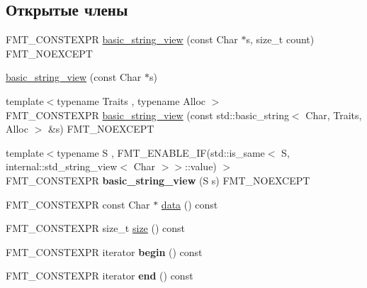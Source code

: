 \subsection*{Открытые члены}
\begin{DoxyCompactItemize}
\item 
F\+M\+T\+\_\+\+C\+O\+N\+S\+T\+E\+X\+PR \hyperlink{classbasic__string__view_a30be409cd941f8fa06e5e7b27496e3dc}{basic\+\_\+string\+\_\+view} (const Char $\ast$s, size\+\_\+t count) F\+M\+T\+\_\+\+N\+O\+E\+X\+C\+E\+PT
\item 
\hyperlink{classbasic__string__view_a84823e4cf3eadc6bbe4ecd18e7685ffd}{basic\+\_\+string\+\_\+view} (const Char $\ast$s)
\item 
{\footnotesize template$<$typename Traits , typename Alloc $>$ }\\F\+M\+T\+\_\+\+C\+O\+N\+S\+T\+E\+X\+PR \hyperlink{classbasic__string__view_a1e4a7e97cbd0ebcd9ca924714d33319c}{basic\+\_\+string\+\_\+view} (const std\+::basic\+\_\+string$<$ Char, Traits, Alloc $>$ \&s) F\+M\+T\+\_\+\+N\+O\+E\+X\+C\+E\+PT
\item 
\mbox{\label{classbasic__string__view_a7205593096752ad43d82f2f7a3a8d7da}} 
{\footnotesize template$<$typename S , F\+M\+T\+\_\+\+E\+N\+A\+B\+L\+E\+\_\+\+I\+F(std\+::is\+\_\+same$<$ S, internal\+::std\+\_\+string\+\_\+view$<$ Char $>$$>$\+::value) $>$ }\\F\+M\+T\+\_\+\+C\+O\+N\+S\+T\+E\+X\+PR {\bfseries basic\+\_\+string\+\_\+view} (S s) F\+M\+T\+\_\+\+N\+O\+E\+X\+C\+E\+PT
\item 
F\+M\+T\+\_\+\+C\+O\+N\+S\+T\+E\+X\+PR const Char $\ast$ \hyperlink{classbasic__string__view_a48c221f626c53e68f6d63105329f6b08}{data} () const
\item 
F\+M\+T\+\_\+\+C\+O\+N\+S\+T\+E\+X\+PR size\+\_\+t \hyperlink{classbasic__string__view_a7fd9f4dcac1782259b0cd217af69d737}{size} () const
\item 
\mbox{\label{classbasic__string__view_a3433da1f079eb7874d97f32245bb08fa}} 
F\+M\+T\+\_\+\+C\+O\+N\+S\+T\+E\+X\+PR iterator {\bfseries begin} () const
\item 
\mbox{\label{classbasic__string__view_a7d262051736a662df0f35d6e39ebf773}} 
F\+M\+T\+\_\+\+C\+O\+N\+S\+T\+E\+X\+PR iterator {\bfseries end} () const
\item 
\mbox{\label{classbasic__string__view_a37ff968596d116787ca3ea3bf0ea85b1}} 

\end{DoxyCompactItemize}
